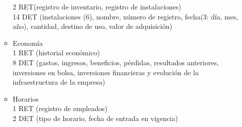 \begin{enumerate}
\begin{itemize}
			2 RET(registro de inventario, registro de instalaciones) \\
			14 DET (instalaciones (6), nombre, número de registro, fecha(3: día, mes, año), cantidad, destino de uso, valor de
			adquisición) \\
			\item Economía \\
			1 RET (historial económico) \\
			8 DET (gastos, ingresos, beneficios, pérdidas, resultados anteriores, inversiones en bolsa, inversiones financieras y
			evolución de la infraestructura de la empresa) \\
			\item Horarios \\
			1 RET (registro de empleados) \\
			2 DET (tipo de horario, fecha de entrada en vigencia) \\
		\end{itemize}
\end{enumerate}
